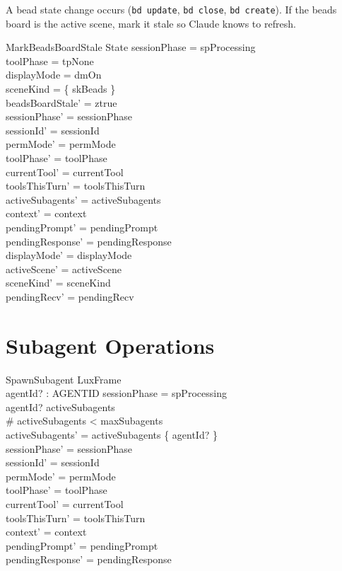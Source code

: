 \documentclass[a4paper,10pt,fleqn]{article}
\begin{document}
A bead state change occurs (\texttt{bd update}, \texttt{bd close},
\texttt{bd create}). If the beads board is the active scene,
mark it stale so Claude knows to refresh.

\begin{schema}{MarkBeadsBoardStale}
  \Delta State
  \where
  sessionPhase = spProcessing \\
  toolPhase = tpNone \\
  displayMode = dmOn \\
  sceneKind = \{ skBeads \} \\
  beadsBoardStale' = ztrue \\
  sessionPhase' = sessionPhase \\
  sessionId' = sessionId \\
  permMode' = permMode \\
  toolPhase' = toolPhase \\
  currentTool' = currentTool \\
  toolsThisTurn' = toolsThisTurn \\
  activeSubagents' = activeSubagents \\
  context' = context \\
  pendingPrompt' = pendingPrompt \\
  pendingResponse' = pendingResponse \\
  displayMode' = displayMode \\
  activeScene' = activeScene \\
  sceneKind' = sceneKind \\
  pendingRecv' = pendingRecv
\end{schema}

\section{Subagent Operations}

\begin{schema}{SpawnSubagent}
  LuxFrame \\
  agentId? : AGENTID
  \where
  sessionPhase = spProcessing \\
  agentId? \notin activeSubagents \\
  \# activeSubagents < maxSubagents \\
  activeSubagents' = activeSubagents \cup \{ agentId? \} \\
  sessionPhase' = sessionPhase \\
  sessionId' = sessionId \\
  permMode' = permMode \\
  toolPhase' = toolPhase \\
  currentTool' = currentTool \\
  toolsThisTurn' = toolsThisTurn \\
  context' = context \\
  pendingPrompt' = pendingPrompt \\
  pendingResponse' = pendingResponse
\end{schema}
\end{document}
